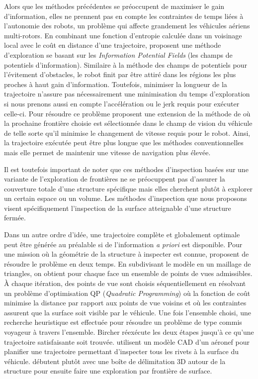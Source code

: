 Alors que les méthodes précédentes se préoccupent de maximiser le gain d'information, elles ne prennent pas en compte les contraintes de temps liées à l'autonomie des robots, un problème qui affecte grandement les véhicules aériens multi-rotors. En combinant une fonction d'entropie calculée dans un voisinage local avec le coût en distance d'une trajectoire, \citep{Wang2017} proposent une méthode d'exploration se basant sur les \textit{Information Potential Fields} (les champs de potentiels d'information). Similaire à la méthode des champs de potentiels pour l'évitement d'obstacles, le robot finit par être attiré dans les régions les plus proches à haut gain d'information. Toutefois, minimiser la longueur de la trajectoire n'assure pas nécessairement une minimisation du temps d'exploration si nous prenons aussi en compte l'accélération ou le jerk requis pour exécuter celle-ci. Pour résoudre ce problème \citep{Cieslewski2017} proposent une extension de la méthode de \citep{Yamauchi1997} où la prochaine frontière choisie est sélectionnée dans le champ de vision du véhicule de telle sorte qu'il minimise le changement de vitesse requis pour le robot. Ainsi, la trajectoire exécutée peut être plus longue que les méthodes conventionnelles mais elle permet de maintenir une vitesse de navigation plus élevée.

Il est toutefois important de noter que ces méthodes d'inspection basées sur une variante de l'exploration de frontières ne se préocuppent pas d'assurer la couverture totale d'une structure spécifique mais elles cherchent plutôt à explorer un certain espace ou un volume. Les méthodes d'inspection que nous proposons visent spécifiquement l'inspection de la surface atteignable d'une structure fermée.

Dans un autre ordre d'idée, une trajectoire complète et globalement optimale peut être générée au préalable si de l'information \textit{a priori} est disponible. Pour une mission où la géométrie de la structure à inspecter est connue, \citep{Bircher2015} proposent de résoudre le problème en deux temps. En subdivisant le modèle en un maillage de triangles, on obtient pour chaque face un ensemble de points de vues admissibles. À chaque itération, des points de vue sont choisis séquentiellement en résolvant un problème d'optimisation QP (\emph{Quadratic Programming}) où la fonction de coût minimise la distance par rapport aux points de vue voisins et où les contraintes assurent que la surface soit visible par le véhicule. Une fois l'ensemble choisi, une recherche heuristique est effectuée pour résoudre un problème de type commis voyageur à travers l'ensemble. Bircher réexécute les deux étapes jusqu'à ce qu'une trajectoire satisfaisante soit trouvée. \citep{sheng2008crawler} utilisent un modèle CAD d'un aéronef pour planifier une trajectoire permettant d'inspecter tous les rivets à la surface du véhicule. \citep{Yoder2016} débutent plutôt avec une boîte de délimitation 3D autour de la structure pour ensuite faire une exploration par frontière de surface.

